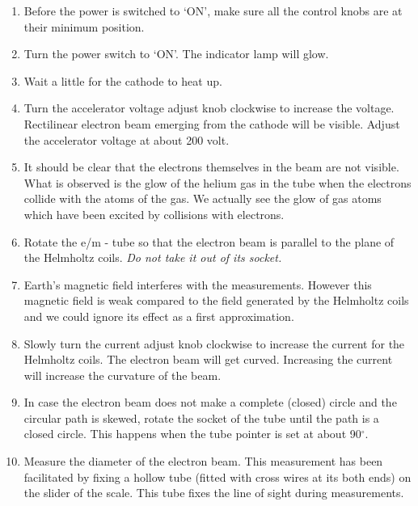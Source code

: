 \documentclass[%
sor,
 jor,
 amsmath,amssymb,
 reprint,
]{revtex4-2}
\begin{document}
\begin{enumerate}
\item Before the power is switched to ‘ON’, make sure all the control knobs are at their minimum position.

\item Turn the power switch to ‘ON’. The indicator lamp will glow.

\item Wait a little for the cathode to heat up.

\item Turn the accelerator voltage adjust knob clockwise to increase the voltage. Rectilinear electron beam emerging from the cathode will be visible. Adjust the accelerator voltage at about 200 volt.

\item It should be clear that the electrons themselves in the beam are not visible. What is observed is the glow of the helium gas in the tube when the electrons collide with the atoms of the gas. We actually see the glow of gas atoms which have been excited by collisions with electrons.

\item Rotate the e/m - tube so that the electron beam is parallel to the plane of the Helmholtz coils. \textit{Do not take it out of its socket.}

\item Earth's magnetic field interferes with the measurements. However this magnetic field is weak compared to the field generated by the Helmholtz coils and we could ignore its effect as a first approximation.

\item Slowly turn the current adjust knob clockwise to increase the current for the Helmholtz coils. The electron beam will get curved. Increasing the current will increase the curvature of the beam.

\item In case the electron beam does not make a complete (closed) circle and the circular path is skewed, rotate the socket of the tube until the path is a closed circle. This happens when the tube pointer is set at about 90$^\circ$.

\item Measure the diameter of the electron beam. This measurement has been facilitated by fixing a hollow tube (fitted with cross wires at its both ends) on the slider of the scale. This tube fixes the line of sight during measurements.


\end{enumerate}
\end{document}
